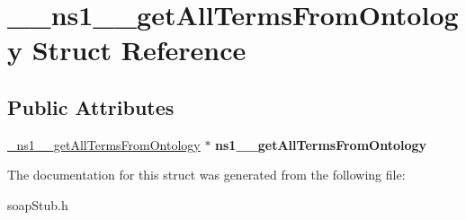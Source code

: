 \hypertarget{struct____ns1____getAllTermsFromOntology}{
\section{\_\-\_\-ns1\_\-\_\-getAllTermsFromOntology Struct Reference}
\label{struct____ns1____getAllTermsFromOntology}
}
\subsection*{Public Attributes}
\begin{DoxyCompactItemize}
\item 
\hypertarget{struct____ns1____getAllTermsFromOntology_a4385de39a74ce75f2676e8bd3b77bfd9}{
\hyperlink{class__ns1____getAllTermsFromOntology}{\_\-ns1\_\-\_\-getAllTermsFromOntology} $\ast$ {\bfseries ns1\_\-\_\-getAllTermsFromOntology}}
\label{struct____ns1____getAllTermsFromOntology_a4385de39a74ce75f2676e8bd3b77bfd9}

\end{DoxyCompactItemize}


The documentation for this struct was generated from the following file:\begin{DoxyCompactItemize}
\item 
soapStub.h\end{DoxyCompactItemize}
